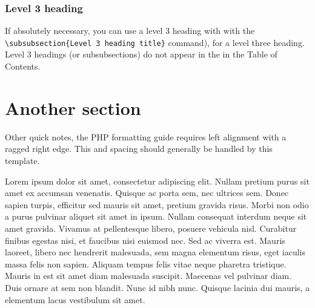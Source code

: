 \subsubsection{Level 3 heading}

If absolutely necessary, you can use a level 3 heading with with the \texttt{\textbackslash subsubsection\{Level 3 heading title\}} command), for a level three heading. Level 3 headings (or subsubsections) do not appear in the in the Table of Contents.


\section{Another section}
\label{ch2:sec:another}

Other quick notes, the PHP formatting guide requires left alignment with a ragged right edge. This and spacing should generally be handled by this template.

Lorem ipsum dolor sit amet, consectetur adipiscing elit. Nullam pretium purus sit amet ex accumsan venenatis. Quisque ac porta sem, nec ultrices sem. Donec sapien turpis, efficitur sed mauris sit amet, pretium gravida risus. Morbi non odio a purus pulvinar aliquet sit amet in ipsum. Nullam consequat interdum neque sit amet gravida. Vivamus at pellentesque libero, posuere vehicula nisl. Curabitur finibus egestas nisi, et faucibus nisi euismod nec. Sed ac viverra est. Mauris laoreet, libero nec hendrerit malesuada, sem magna elementum risus, eget iaculis massa felis non sapien. Aliquam tempus felis vitae neque pharetra tristique. Mauris in est sit amet diam malesuada suscipit. Maecenas vel pulvinar diam. Duis ornare at sem non blandit. Nunc id nibh nunc. Quisque lacinia dui mauris, a elementum lacus vestibulum sit amet. 